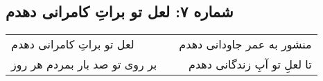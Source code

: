 \begin{center}
\section*{شماره ۷: لعل تو براتِ کامرانی دهدم}
\label{sec:007}
\begin{longtable}{l p{0.5cm} r}
لعل تو براتِ کامرانی دهدم
&&
منشور به عمر جاودانی دهدم
\\
بر روی تو صد بار بمردم هر روز
&&
تا لعلِ تو آبِ زندگانی دهدم
\\
\end{longtable}
\end{center}
